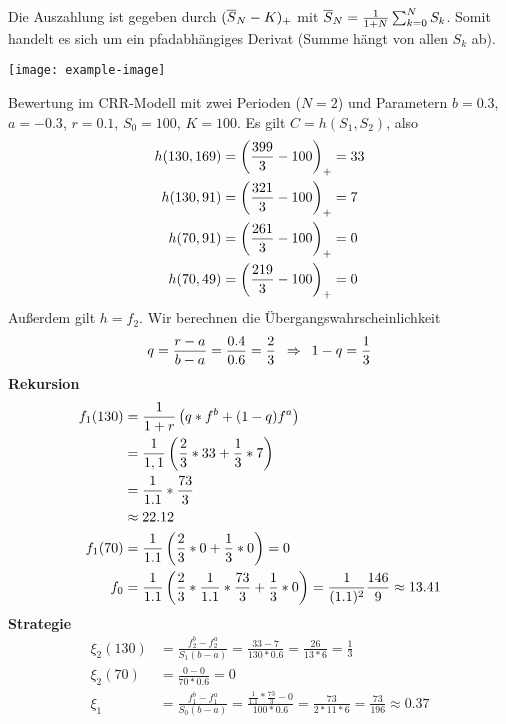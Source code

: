 \begin{*beispiel}
	Die Auszahlung ist gegeben durch $(\overline{S}_N - K)_+$ mit $\overline{S}_N = \frac{1}{1+N} \sum_{k=0}^{N} S_k$. Somit handelt es sich um ein pfadabhängiges Derivat (Summe hängt von allen $S_k$ ab). 
	
	\begin{center}
		\texttt{[image: example-image]}
	\end{center}

	Bewertung im CRR-Modell mit zwei Perioden ($N=2$) und Parametern $b = 0.3$, $a = -0.3$, $r=0.1$, $S_0 = 100$, $K=100$.
		Es gilt $C = h(S_1, S_2)$, also
	\begin{align*}
		h(130,169) &= \left( \frac{399}{3} - 100 \right)_+ = 33 \\
		h(130,91)  &= \left( \frac{321}{3} - 100 \right)_+ = 7 \\
		h(70, 91)  &= \left( \frac{261}{3} - 100 \right)_+ = 0 \\
		h(70, 49)  &= \left( \frac{219}{3} - 100 \right)_+ = 0 \\
	\end{align*} 
	Außerdem gilt $h = f_2$. Wir berechnen die Übergangswahrscheinlichkeit
	\begin{equation*}
		q = \frac{r-a}{b-a} = \frac{0.4}{0.6} = \frac{2}{3} \enskip \Rightarrow \enskip 1 - q = \frac{1}{3}
	\end{equation*}
	\textbf{Rekursion}
	\begin{align*}
		f_1(130) &= \frac{1}{1+r} \left( q * f^b + (1-q) f^a \right) \\
		&= \frac{1}{1,1} \left( \frac{2}{3} * 33 + \frac{1}{3} * 7 \right) \\
		&= \frac{1}{1.1} * \frac{73}{3} \\
		&\approx 22.12 \\
		f_1(70) &= \frac{1}{1.1} \left( \frac{2}{3} * 0 + \frac{1}{3} * 0 \right) = 0 \\
		f_0 &= \frac{1}{1.1} \left( \frac{2}{3} * \frac{1}{1.1} * \frac{73}{3} + \frac{1}{3} * 0 \right) = \frac{1}{(1.1)^2} \frac{146}{9} \approx 13.41 
	\end{align*}
	\textbf{Strategie}
	\begin{align*}
		\xi_2(130) &= \frac{f_2^b - f_2^a}{S_1 (b-a)} = \frac{33 - 7}{130 * 0.6} = \frac{26}{13*6} = \frac{1}{3} \\
		\xi_2(70) &= \frac{0-0}{70 * 0.6} = 0 \\
		\xi_1 &= \frac{f_1^b - f_1^a}{S_0 (b-a)} = \frac{\frac{1}{1.1} * \frac{73}{3} - 0}{100 * 0.6} = \frac{73}{2*11*6} = \frac{73}{196} \approx 0.37
	\end{align*}
\end{*beispiel}


